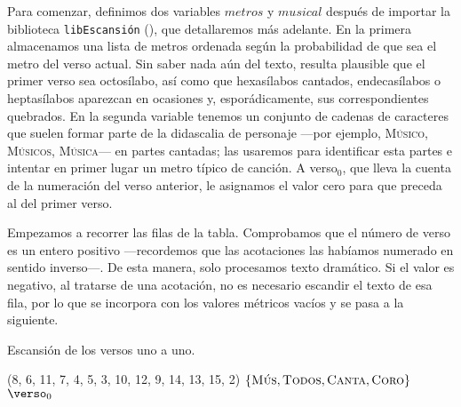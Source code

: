 	Para comenzar, definimos dos variables $metros$ y $musical$ después de importar la biblioteca \texttt{libEscansión} (), que detallaremos más adelante. En la primera almacenamos una lista de metros ordenada según la probabilidad de que sea el metro del verso actual. Sin saber nada aún del texto, resulta plausible que el primer verso sea octosílabo, así como que hexasílabos cantados, endecasílabos o heptasílabos aparezcan en ocasiones y, esporádicamente, sus correspondientes quebrados. En la segunda variable tenemos un conjunto de cadenas de caracteres que suelen formar parte de la didascalia de personaje  —por ejemplo, \textsc{Músico}, \textsc{Músicos}, \textsc{Música}— en partes cantadas; las usaremos para identificar esta partes e intentar en primer lugar un metro típico de canción. A {\sans verso$_0$}, que lleva la cuenta de la numeración del verso anterior, le asignamos el valor cero para que preceda al del primer verso.
	
	Empezamos a recorrer las filas de la tabla. Comprobamos que el número de verso es un entero positivo —recordemos que las acotaciones las habíamos numerado en sentido inverso—. De esta manera, solo procesamos texto dramático. Si el valor es negativo, al tratarse de una acotación, no es necesario escandir el texto de esa fila, por lo que se incorpora con los valores métricos vacíos y se pasa a la siguiente.
	
	\begin{algorithm}[!ht] %
		\caption{Escansión de los versos uno a uno.}\label{list:scansionpy1}
		\;
		\metros \gets (8, 6, 11, 7, 4, 5, 3, 10, 12, 9, 14, 13, 15, 2) \;
		\musical \gets $\{\textsc{Mús}, \textsc{Todos}, \textsc{Canta}, \textsc{Coro}\}$\;
		$\verso_{0}$  \;
	\end{algorithm}

